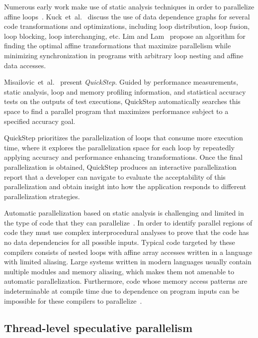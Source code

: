 \documentclass[a4paper,12pt]{article}
\newcommand{\etal}{et~al.}
\begin{document}
Numerous early work make use of static analysis techniques in order to
parallelize affine loops~\cite{kuck81,padua93,blume94,lim97}.
Kuck~\etal~\cite{kuck81} discuss the use of data dependence graphs for several
code transformations and optimizations, including loop distribution, loop
fusion, loop blocking, loop interchanging, etc.  Lim and Lam~\cite{lim97}
propose an algorithm for finding the optimal affine transformations that
maximize parallelism while minimizing synchronization in programs with
arbitrary loop nesting and affine data accesses.

Misailovic~\etal~\cite{misailovic13} present {\em QuickStep}. Guided by
performance measurements, static analysis, loop and memory profiling
information, and statistical accuracy tests on the outputs of test executions,
QuickStep automatically searches this space to find a parallel program that
maximizes performance subject to a specified accuracy goal.

QuickStep prioritizes the parallelization of loops that consume more execution
time, where it explores the parallelization space for each loop by repeatedly
applying accuracy and performance enhancing transformations.  Once the final
parallelization is obtained, QuickStep produces an interactive parallelization
report that a developer can navigate to evaluate the acceptability of this
parallelization and obtain insight into how the application responds to
different parallelization strategies.

Automatic parallelization based on static analysis is challenging and limited
in the type of code that they can
parallelize~\cite{bruening98,kennedy01,chen03}.  In order to identify parallel
regions of code they must use complex interprocedural analyses to prove that
the code has no data dependencies for all possible inputs.  Typical code
targeted by these compilers consists of nested loops with affine array accesses
written in a language with limited aliasing.  Large systems written in modern
languages usually contain multiple modules and memory aliasing, which makes
them not amenable to automatic parallelization.  Furthermore, code whose memory
access patterns are indeterminable at compile time due to dependence on program
inputs can be impossible for these compilers to parallelize~\cite{bruening98}.

\subsection{Thread-level speculative parallelism}
\end{document}
